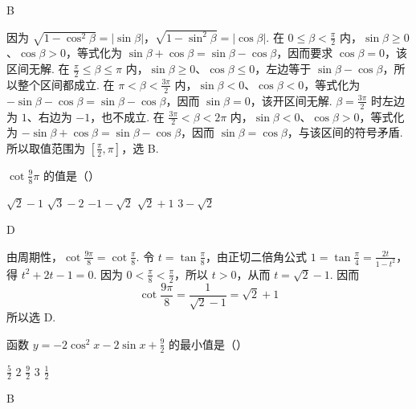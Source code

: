 \documentclass[UTF8,a4paper,oneside,11pt]{ctexbook}
\begin{document}
\begin{answer}
B
\end{answer}

\begin{solution}
因为
\(\sqrt{1-\cos^2\beta}=|\sin\beta|\)，\(\sqrt{1-\sin^2\beta}=|\cos\beta|\).
在 \(0\leq\beta<\frac{\pi}{2}\) 内，\(\sin\beta\geq0\)、\(\cos\beta>0\)，等式化为 \(\sin\beta+\cos\beta=\sin\beta-\cos\beta\)，因而要求 \(\cos\beta=0\)，该区间无解. 在 \(\frac{\pi}{2}\leq\beta\leq\pi\) 内，\(\sin\beta\geq0\)、\(\cos\beta\leq0\)，左边等于 \(\sin\beta-\cos\beta\)，所以整个区间都成立. 在 \(\pi<\beta<\frac{3\pi}{2}\) 内，\(\sin\beta<0\)、\(\cos\beta<0\)，等式化为 \(-\sin\beta-\cos\beta=\sin\beta-\cos\beta\)，因而 \(\sin\beta=0\)，该开区间无解. \(\beta=\frac{3\pi}{2}\) 时左边为 \(1\)、右边为 \(-1\)，也不成立. 在 \(\frac{3\pi}{2}<\beta<2\pi\) 内，\(\sin\beta<0\)、\(\cos\beta>0\)，等式化为 \(-\sin\beta+\cos\beta=\sin\beta-\cos\beta\)，因而 \(\sin\beta=\cos\beta\)，与该区间的符号矛盾. 所以取值范围为 \([\frac{\pi}{2},\pi]\)，选 B.
\end{solution}


\begin{problem}

\(\cot \frac{9}{8} \pi\) 的值是（\quad）

\choicesfive
    {\(\sqrt{2} - 1\)}
    {\(\sqrt{3} - 2\)}
    {\(-1 - \sqrt{2}\)}
    {\(\sqrt{2} + 1\)}
    {\(3 - \sqrt{2}\)}
\end{problem}

\begin{answer}
D
\end{answer}

\begin{solution}
由周期性，\(\cot\frac{9\pi}{8}=\cot\frac{\pi}{8}\). 令 \(t=\tan\frac{\pi}{8}\)，由正切二倍角公式 \(1=\tan\frac{\pi}{4}=\frac{2t}{1-t^2}\)，得 \(t^2+2t-1=0\). 因为 \(0<\frac{\pi}{8}<\frac{\pi}{2}\)，所以 \(t>0\)，从而 \(t=\sqrt{2}-1\). 因而
\[
\cot\frac{9\pi}{8}=\frac{1}{\sqrt{2}-1}=\sqrt{2}+1
\]
所以选 D.
\end{solution}


\begin{problem}

函数 \(y = -2\cos^2 x - 2\sin x + \frac{9}{2} \) 的最小值是（\quad）

\choicesfive
    {\(\frac{5}{2}\)}
    {\(2\)}
    {\(\frac{9}{2}\)}
    {\(3\)}
    {\(\frac{1}{2} \)}
\end{problem}

\begin{answer}
B
\end{answer}
\end{document}
